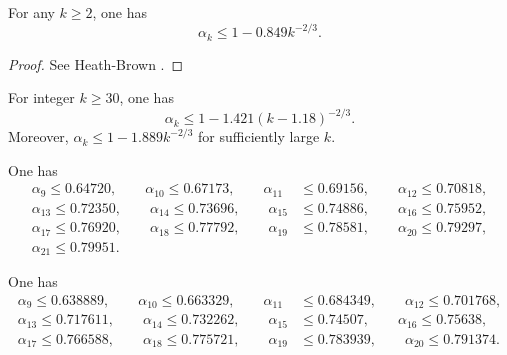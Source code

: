 \begin{lemma}\label{hb-alpha-large}
For any $k \ge 2$, one has
\[
\alpha_k \le 1 - 0.849k^{-2/3}.
\]
\end{lemma}
\begin{proof}
See Heath-Brown \cite{heathbrown_new_2017}.
\end{proof}

\begin{theorem}For integer $k \ge 30$, one has
\[
\alpha_k \leq 1 - 1.421(k - 1.18)^{-2/3}.
\]
Moreover, $\alpha_k \leq 1 - 1.889k^{-2/3}$ for sufficiently large $k$.
\end{theorem}

\begin{theorem}One has
\begin{align*}
\alpha_{9} \le 0.64720,\qquad \alpha_{10} \le 0.67173,\qquad \alpha_{11} &\le 0.69156,\qquad \alpha_{12} \le 0.70818,\\
\alpha_{13} \le 0.72350, \qquad \alpha_{14} \le 0.73696,\qquad \alpha_{15} &\le 0.74886,\qquad \alpha_{16} \le 0.75952,\\
\alpha_{17} \le 0.76920, \qquad \alpha_{18} \le 0.77792,\qquad \alpha_{19} &\le 0.78581,\qquad \alpha_{20} \le 0.79297,\\
\alpha_{21} \le 0.79951.
\end{align*}
\end{theorem}

\begin{theorem}One has
\begin{align*}
\alpha_{9} \le 0.638889,\qquad \alpha_{10} \le 0.663329,\qquad \alpha_{11} &\le 0.684349,\qquad \alpha_{12} \le 0.701768,\\
\alpha_{13} \le 0.717611, \qquad \alpha_{14} \le 0.732262,\qquad \alpha_{15} &\le 0.74507,\qquad \alpha_{16} \le 0.75638,\\
\alpha_{17} \le 0.766588, \qquad \alpha_{18} \le 0.775721,\qquad \alpha_{19} &\le 0.783939,\qquad \alpha_{20} \le 0.791374.
\end{align*}
\end{theorem}
